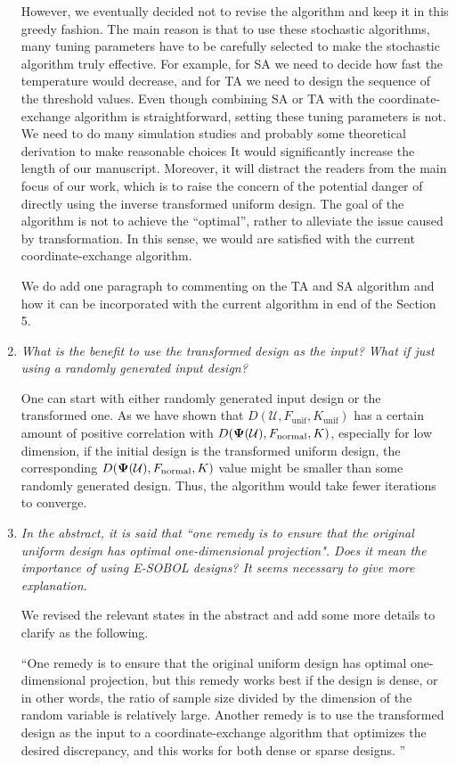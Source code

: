 \documentclass[12pt]{article}
\theoremstyle{definition}
\newcommand{\vPsi}{\boldsymbol{\Psi}}
\newcommand{\Udes}{\mathcal{U}}
\newcommand{\normal}{\textup{normal}}
\begin{document}
\begin{enumerate}
However, we eventually decided not to revise the algorithm and keep it in this greedy fashion. 
The main reason is that to use these stochastic algorithms, many tuning parameters have to be carefully selected to make the stochastic algorithm truly effective. 
For example, for SA we need to decide how fast the temperature would decrease, and for TA we need to design the sequence of the threshold values. 
Even though combining SA or TA with the coordinate-exchange algorithm is straightforward, setting these tuning parameters is not. 
We need to do many simulation studies and probably some theoretical derivation to make reasonable choices
It would significantly increase the length of our manuscript. 
Moreover, it will distract the readers from the main focus of our work, which is to raise the concern of the potential danger of directly using the inverse transformed uniform design. 
The goal of the algorithm is not to achieve the ``optimal'', rather to alleviate the issue caused by transformation. 
In this sense, we would are satisfied with the current coordinate-exchange algorithm. 


We do add one paragraph to commenting on the TA and SA algorithm and how it can be incorporated with the current algorithm in end of the Section 5. 


\item
\emph{What is the benefit to use the transformed design as the input? What if just using a randomly generated input design?}

One can start with either randomly generated input design or the transformed one. 
As we have shown that $D(\mathcal{U}, F_{\textrm{unif}}, K_{\textrm{unif}})$ has a certain amount of positive correlation with $D(\vPsi(\Udes),F_\normal, K)$, especially for low dimension, if the initial design is the transformed uniform design, the corresponding $D(\vPsi(\Udes),F_\normal, K)$ value might be smaller than some randomly generated design. 
Thus, the algorithm would take fewer iterations to converge. 

\item \emph{In the abstract, it is said that ``one remedy is to ensure that the original uniform design has optimal one-dimensional projection". Does it mean the importance of using E-SOBOL designs? It seems necessary to give more explanation.}

We revised the relevant states in the abstract and add some more details to clarify as the following. 

``One remedy is to ensure that the original uniform design has optimal one-dimensional projection, but this remedy works best if the design is dense, or in other words, the ratio of sample size divided by the dimension of the random variable is relatively large. 
Another remedy is to use the transformed design as the input to a coordinate-exchange algorithm that optimizes the desired discrepancy, and this works for both dense or sparse designs. ''


\end{enumerate}
\end{document}
